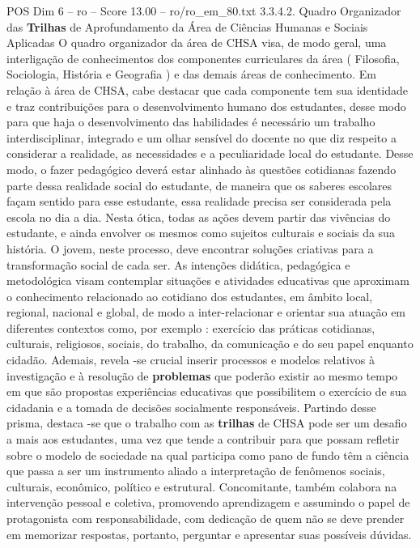 \begin{textsample}{POS Dim 6 – ro – Score 13.00 – ro/ro\_em\_80.txt}  \label{ex:f6_pos_131}
3.3.4.2.
Quadro Organizador das \textbf{Trilhas} de Aprofundamento da Área de Ciências Humanas e Sociais Aplicadas O quadro organizador da área de CHSA visa, de modo geral, uma interligação de conhecimentos dos componentes curriculares da área ( Filosofia, Sociologia, História e Geografia ) e das demais áreas de conhecimento.
Em relação à área de CHSA, cabe destacar que cada componente tem sua identidade e traz contribuições para o desenvolvimento humano dos estudantes, desse modo para que haja o desenvolvimento das habilidades é necessário um trabalho interdisciplinar, integrado e um olhar sensível do docente no que diz respeito a considerar a realidade, as necessidades e a peculiaridade local do estudante.
Desse modo, o fazer pedagógico deverá estar alinhado às questões cotidianas fazendo parte dessa realidade social do estudante, de maneira que os saberes escolares façam sentido para esse estudante, essa realidade precisa ser considerada pela escola no dia a dia.
Nesta ótica, todas as ações devem partir das vivências do estudante, e ainda envolver os mesmos como sujeitos culturais e sociais da sua história.
O jovem, neste processo, deve encontrar soluções criativas para a transformação social de cada ser.
As intenções didática, pedagógica e metodológica visam contemplar situações e atividades educativas que aproximam o conhecimento relacionado ao cotidiano dos estudantes, em âmbito local, regional, nacional e global, de modo a inter-relacionar e orientar sua atuação em diferentes contextos como, por exemplo : exercício das práticas cotidianas, culturais, religiosos, sociais, do trabalho, da comunicação e do seu papel enquanto cidadão.
Ademais, revela -se crucial inserir processos e modelos relativos à investigação e à resolução de \textbf{problemas} que poderão existir ao mesmo tempo em que são propostas experiências educativas que possibilitem o exercício de sua cidadania e a tomada de decisões socialmente responsáveis.
Partindo desse prisma, destaca -se que o trabalho com as \textbf{trilhas} de CHSA pode ser um desafio a mais aos estudantes, uma vez que tende a contribuir para que possam refletir sobre o modelo de sociedade na qual participa como pano de fundo têm a ciência que passa a ser um instrumento aliado a interpretação de fenômenos sociais, culturais, econômico, político e estrutural.
Concomitante, também colabora na intervenção pessoal e coletiva, promovendo aprendizagem e assumindo o papel de protagonista com responsabilidade, com dedicação de quem não se deve prender em memorizar respostas, portanto, perguntar e apresentar suas possíveis dúvidas.

\end{textsample}
